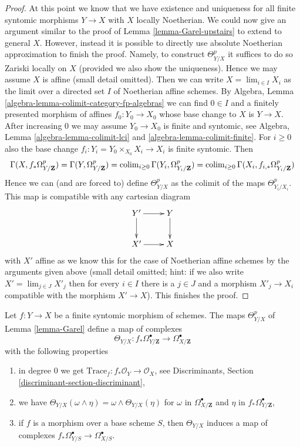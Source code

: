 \begin{proof}
\medskip\noindent
At this point we know that we have existence and uniqueness
for all finite syntomic morphisms $Y \to X$ with $X$ locally Noetherian.
We could now give an argument similar to the proof of
Lemma \ref{lemma-Garel-upstairs} to extend to general $X$.
However, instead it is possible to directly use
absolute Noetherian approximation to finish the proof.
Namely, to construct $\Theta^p_{Y/X}$
it suffices to do so Zariski locally on $X$ (provided we also
show the uniqueness). Hence we may assume $X$ is affine (small
detail omitted). Then we can write $X = \lim_{i \in I} X_i$
as the limit over a directed set $I$ of Noetherian affine schemes.
By Algebra, Lemma \ref{algebra-lemma-colimit-category-fp-algebras}
we can find $0 \in I$ and a finitely
presented morphism of affines $f_0 : Y_0 \to X_0$ whose base change to
$X$ is $Y \to X$. After increasing $0$ we may assume $Y_0 \to X_0$
is finite and syntomic, see
Algebra, Lemma \ref{algebra-lemma-colimit-lci} and
\ref{algebra-lemma-colimit-finite}. For $i \geq 0$ also the
base change $f_i : Y_i = Y_0 \times_{X_0} X_i \to X_i$ is finite syntomic.
Then
$$
\Gamma(X, f_*\Omega^p_{Y/\mathbf{Z}}) =
\Gamma(Y, \Omega^p_{Y/\mathbf{Z}}) =
\mathop{\mathrm{colim}}\nolimits_{i \geq 0} \Gamma(Y_i, \Omega^p_{Y_i/\mathbf{Z}}) =
\mathop{\mathrm{colim}}\nolimits_{i \geq 0} \Gamma(X_i, f_{i, *}\Omega^p_{Y_i/\mathbf{Z}})
$$
Hence we can (and are forced to) define $\Theta^p_{Y/X}$ as the colimit
of the maps $\Theta^p_{Y_i/X_i}$. This map is compatible with any
cartesian diagram
$$
\xymatrix{
Y' \ar[r] \ar[d] & Y \ar[d] \\
X' \ar[r] & X
}
$$
with $X'$ affine as we know this for the case of Noetherian affine schemes
by the arguments given above (small detail omitted; hint: if we also
write $X' = \lim_{j \in J} X'_j$ then for every $i \in I$ there is a $j \in J$
and a morphism $X'_j \to X_i$ compatible with the morphism $X' \to X$).
This finishes the proof.
\end{proof}

\begin{proposition}
\label{proposition-Garel}
\begin{reference}
\cite{Garel}
\end{reference}
Let $f : Y \to X$ be a finite syntomic morphism of schemes.
The maps $\Theta^p_{Y/X}$ of Lemma \ref{lemma-Garel} define a map of complexes
$$
\Theta_{Y/X} :
f_*\Omega^\bullet_{Y/\mathbf{Z}}
\longrightarrow
\Omega^\bullet_{X/\mathbf{Z}}
$$
with the following properties
\begin{enumerate}
\item in degree $0$ we get
$\text{Trace}_f : f_*\mathcal{O}_Y \to \mathcal{O}_X$, see
Discriminants, Section \ref{discriminant-section-discriminant},
\item we have
$\Theta_{Y/X}(\omega \wedge \eta) = \omega \wedge \Theta_{Y/X}(\eta)$
for $\omega$ in $\Omega^\bullet_{X/\mathbf{Z}}$ and $\eta$
in $f_*\Omega^\bullet_{Y/\mathbf{Z}}$,
\item if $f$ is a morphism over a base scheme $S$, then
$\Theta_{Y/X}$ induces a map of complexes
$f_*\Omega^\bullet_{Y/S} \to \Omega^\bullet_{X/S}$.
\end{enumerate}
\end{proposition}

